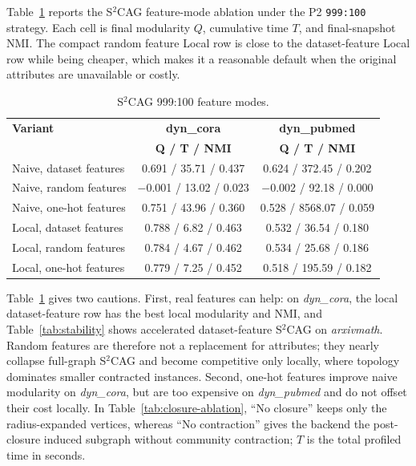 \documentclass[conference]{IEEEtran}
\theoremstyle{definition}
\begin{document}
Table~\ref{tab:feature-ablation} reports the S$^2$CAG feature-mode ablation
under the P2 \texttt{999:100} strategy. Each cell is final modularity $Q$,
cumulative time $T$, and final-snapshot NMI. The compact random feature Local
row is close to the dataset-feature Local row while being cheaper, which makes
it a reasonable default when the original attributes are unavailable or costly.

\begin{table}[H]
\centering
\caption{S$^2$CAG 999:100 feature modes.}
\label{tab:feature-ablation}
\setlength{\tabcolsep}{2pt}
\scriptsize
\begin{tabular}{@{}lcc@{}}
\toprule
\textbf{Variant} & \textbf{dyn\_cora} & \textbf{dyn\_pubmed} \\
 & \textbf{Q / T / NMI} & \textbf{Q / T / NMI} \\
\midrule
Naive, dataset features & 0.691 / 35.71 / 0.437 & 0.624 / 372.45 / 0.202 \\
Naive, random features  & $-$0.001 / 13.02 / 0.023 & $-$0.002 / 92.18 / 0.000 \\
Naive, one-hot features & 0.751 / 43.96 / 0.360 & 0.528 / 8568.07 / 0.059 \\
Local, dataset features & 0.788 / 6.82 / 0.463 & 0.532 / 36.54 / 0.180 \\
Local, random features  & 0.784 / 4.67 / 0.462 & 0.534 / 25.68 / 0.186 \\
Local, one-hot features & 0.779 / 7.25 / 0.452 & 0.518 / 195.59 / 0.182 \\
\bottomrule
\end{tabular}
\end{table}

Table~\ref{tab:feature-ablation} gives two cautions. First, real features can
help: on \textit{dyn\_cora}, the local dataset-feature row has the best local
modularity and NMI, and Table~\ref{tab:stability} shows accelerated
dataset-feature S$^2$CAG on \textit{arxivmath}. Random features are therefore
not a replacement for attributes; they nearly collapse full-graph S$^2$CAG and
become competitive only locally, where topology dominates smaller contracted
instances. Second, one-hot features improve naive modularity on
\textit{dyn\_cora}, but are too expensive on \textit{dyn\_pubmed} and do not
offset their cost locally.
In Table~\ref{tab:closure-ablation}, ``No closure'' keeps only the
radius-expanded vertices, whereas ``No contraction'' gives the backend the
post-closure induced subgraph without community contraction; $T$ is the total
profiled time in seconds.
\end{document}
